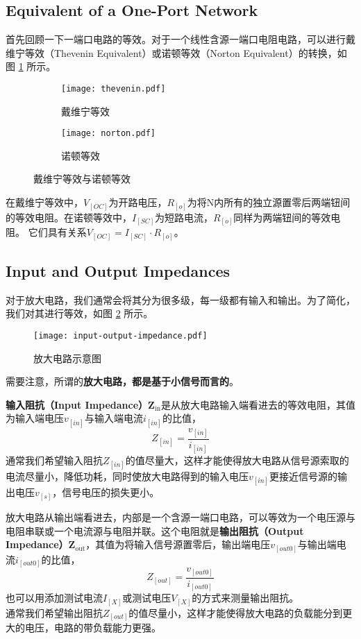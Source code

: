 \subsection{Equivalent of a One-Port Network}
首先回顾一下一端口电路的等效。对于一个线性含源一端口电阻电路，可以进行戴维宁等效（Thevenin Equivalent）或诺顿等效（Norton Equivalent）的转换，如图 \ref{fig:thevenin-norton-equivalent} 所示。
\begin{figure}[htp!]
    \centering
    \begin{subfigure}[b]{\textwidth}
        \centering
        \texttt{[image: thevenin.pdf]}
        \caption{戴维宁等效}
    \end{subfigure}
    \begin{subfigure}[b]{\textwidth}
        \centering
        \texttt{[image: norton.pdf]}
        \caption{诺顿等效}
    \end{subfigure}
    \caption{戴维宁等效与诺顿等效}
    \label{fig:thevenin-norton-equivalent}
\end{figure}

在戴维宁等效中，$V_[OC]$为开路电压，$R_[o]$为将N内所有的独立源置零后两端钮间的等效电阻。在诺顿等效中，$I_[SC]$为短路电流，$R_[o]$同样为两端钮间的等效电阻。
它们具有关系$V_[OC] = I_[SC] \cdot R_[o]$。

\subsection{Input and Output Impedances}
对于放大电路，我们通常会将其分为很多级，每一级都有输入和输出。为了简化，我们对其进行等效，如图 \ref{fig:input-output-impedance} 所示。
\begin{figure}[!htb]
    \centering
    \texttt{[image: input-output-impedance.pdf]}
    \caption{放大电路示意图}
    \label{fig:input-output-impedance}
\end{figure}
需要注意，所谓的\textbf{放大电路，都是基于小信号而言的}。

\textbf{输入阻抗（Input Impedance）}$\bm{Z_{\mathrm{in}}}$是从放大电路输入端看进去的等效电阻，其值为输入端电压$v_[in]$与输入端电流$i_[in]$的比值，
\begin{equation}
    Z_[in] = \frac{v_[in]}{i_[in]}
\end{equation}
通常我们希望输入阻抗$Z_[in]$的值尽量大，这样才能使得放大电路从信号源索取的电流尽量小，降低功耗，同时使放大电路得到的输入电压$v_[in]$更接近信号源的输出电压$v_[s]$，信号电压的损失更小。

放大电路从输出端看进去，内部是一个含源一端口电路，可以等效为一个电压源与电阻串联或一个电流源与电阻并联。这个电阻就是\textbf{输出阻抗（Output Impedance）}$\bm{Z_{\mathrm{out}}}$，其值为将输入信号源置零后，输出端电压$v_[out0]$与输出端电流$i_[out0]$的比值，
\begin{equation}
    Z_[out] = \frac{v_[out0]}{i_[out0]}
\end{equation}
也可以用添加测试电流$I_[X]$或测试电压$V_[X]$的方式来测量输出阻抗。\\
通常我们希望输出阻抗$Z_[out]$的值尽量小，这样才能使得放大电路的负载能分到更大的电压，电路的带负载能力更强。

